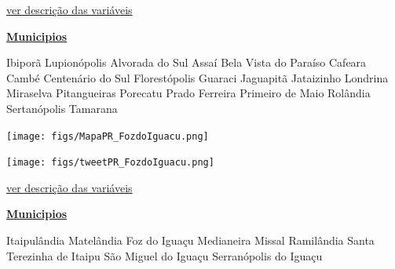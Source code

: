 \documentclass[10pt]{article} %
\begin{document}
\begin{minipage}[t]{.66\linewidth}
\begin{center}

\end{center}
\small{\hyperlink{vartab}{ver descrição das variáveis}}\end{minipage}\hfill\begin{minipage}[t]{.30\linewidth}
\begin{mdframed}[style=sidebar,frametitle={}]
\textbf{\hyperlink{municips}{Municipios}}\begin{itemize}\gsquare Ibiporã 
\gsquare Lupionópolis 
\gsquare Alvorada do Sul 
\gsquare Assaí 
\gsquare Bela Vista do Paraíso 
\gsquare Cafeara 
\gsquare Cambé 
\gsquare Centenário do Sul 
\gsquare Florestópolis 
\gsquare Guaraci 
\gsquare Jaguapitã 
\ysquare Jataizinho 
\gsquare Londrina 
\gsquare Miraselva 
\gsquare Pitangueiras 
\gsquare Porecatu 
\gsquare Prado Ferreira 
\gsquare Primeiro de Maio 
\gsquare Rolândia 
\gsquare Sertanópolis 
\gsquare Tamarana 
\end{itemize}\BackToContents\end{mdframed}\hfill\end{minipage}\newpage\begin{minipage}[t]{.66\linewidth}
\hypertarget{FzdI}{}
\texttt{[image: figs/MapaPR\_FozdoIguacu.png]}\vspace{0.5cm}\vspace{0.5cm}\begin{center}
\texttt{[image: figs/tweetPR\_FozdoIguacu.png]}\end{center}
\begin{center}

\end{center}
\small{\hyperlink{vartab}{ver descrição das variáveis}}\end{minipage}\hfill\begin{minipage}[t]{.30\linewidth}
\begin{mdframed}[style=sidebar,frametitle={}]
\textbf{\hyperlink{municips}{Municipios}}\begin{itemize}\gsquare Itaipulândia 
\gsquare Matelândia 
\gsquare Foz do Iguaçu 
\gsquare Medianeira 
\gsquare Missal 
\gsquare Ramilândia 
\gsquare Santa Terezinha de Itaipu 
\gsquare São Miguel do Iguaçu 
\gsquare Serranópolis do Iguaçu 
\end{itemize}\BackToContents\end{mdframed}\hfill\end{minipage}\newpage\begin{minipage}[t]{.66\linewidth}

\end{minipage}
\end{document}
